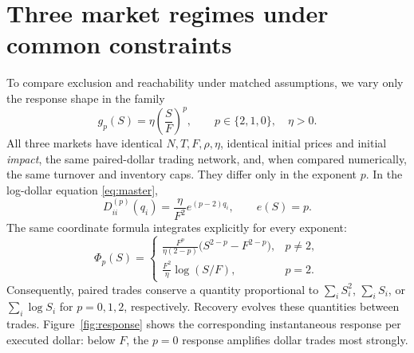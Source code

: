 \documentclass[review,hidelinks,onefignum,onetabnum]{siamonline250211}
\begin{document}
\section{Three market regimes under common constraints}\label{sec:regimes}
To compare exclusion and reachability under matched assumptions, we vary only the response shape in the family
\begin{equation}\label{eq:power}
 g_p(S)=\eta\left(\frac SF\right)^p,\qquad p\in\{2,1,0\},\quad \eta>0.
\end{equation}
All three markets have identical $N,T,F,\rho,\eta$, identical initial prices and initial \emph{impact}, the same paired-dollar trading network, and, when compared numerically, the same turnover and inventory caps. They differ only in the exponent $p$. In the log-dollar equation \eqref{eq:master},
\begin{equation}\label{eq:powerd}
 D_{ii}^{(p)}(q_i)=\frac\eta{F^2}e^{(p-2)q_i},\qquad e(S)=p.
\end{equation}
The same coordinate formula integrates explicitly for every exponent:
\[
\Phi_p(S)=\begin{cases}
\displaystyle \frac{F^p}{\eta(2-p)}\big(S^{2-p}-F^{2-p}\big),&p\ne2,\\[4pt]
\displaystyle \frac{F^2}{\eta}\log(S/F),&p=2.
\end{cases}
\]
Consequently, paired trades conserve a quantity proportional to $\sum_iS_i^2$, $\sum_iS_i$, or $\sum_i\log S_i$ for $p=0,1,2$, respectively. Recovery evolves these quantities between trades. Figure~\ref{fig:response} shows the corresponding instantaneous response per executed dollar: below $F$, the $p=0$ response amplifies dollar trades most strongly.
\end{document}
